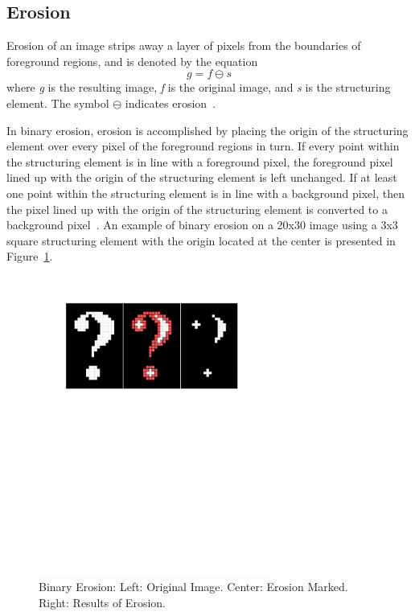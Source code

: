 \documentclass{sig-alternate}
\begin{document}
\subsection{Erosion}\label{erosion}
Erosion of an image strips away a layer of pixels from the boundaries of foreground regions, and is denoted by the equation
\begin{equation*}
g = f \ominus s
\end{equation*}
where \textit{g} is the resulting image, \textit{f} is the original image, and \textit{s} is the structuring element. The symbol $\ominus$ indicates erosion~\cite{MorphologyWikiAnonymous, MorphologyBook:2000}.

In binary erosion, erosion is accomplished by placing the origin of the structuring element over every pixel of the foreground regions in turn. If every point within the structuring element is in line with a foreground pixel, the foreground pixel lined up with the origin of the structuring element is left unchanged. If at least one point within the structuring element is in line with a background pixel, then the pixel lined up with the origin of the structuring element is converted to a background pixel~\cite{MorphologyWiki}. An example of binary erosion on a 20x30 image using a 3x3 square structuring element with the origin located at the center is presented in Figure~\ref{binary erosion figure}.
\begin{figure}
\centering
\includegraphics[width=3in,trim={0 6.75in 0 0},clip]{erosion}
\caption{Binary Erosion: Left: Original Image. Center: Erosion Marked. Right: Results of Erosion.}
\label{binary erosion figure}
\end{figure}
\end{document}
